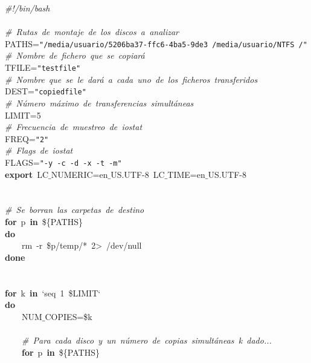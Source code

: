 \noindent
\mbox{}\textit{\#!/bin/bash} \\
\mbox{} \\
\mbox{}\textit{\#\ Rutas\ de\ montaje\ de\ los\ discos\ a\ analizar} \\
\mbox{}PATHS=\texttt{"{}/media/usuario/5206ba37-ffc6-4ba5-9de3\ /media/usuario/NTFS\ /"{}} \\
\mbox{}\textit{\#\ Nombre\ de\ fichero\ que\ se\ copiará} \\
\mbox{}TFILE=\texttt{"{}testfile"{}} \\
\mbox{}\textit{\#\ Nombre\ que\ se\ le\ dará\ a\ cada\ uno\ de\ los\ ficheros\ transferidos} \\
\mbox{}DEST=\texttt{"{}copiedfile"{}} \\
\mbox{}\textit{\#\ Número\ máximo\ de\ transferencias\ simultáneas} \\
\mbox{}LIMIT=5 \\
\mbox{}\textit{\#\ Frecuencia\ de\ muestreo\ de\ iostat} \\
\mbox{}FREQ=\texttt{"{}2"{}} \\
\mbox{}\textit{\#\ Flags\ de\ iostat} \\
\mbox{}FLAGS=\texttt{"{}-y\ -c\ -d\ -x\ -t\ -m"{}}\  \\
\mbox{}\textbf{export}\ LC$\_$NUMERIC=en$\_$US.UTF-8\ LC$\_$TIME=en$\_$US.UTF-8 \\
\mbox{} \\
\mbox{} \\
\mbox{}\textit{\#\ Se\ borran\ las\ carpetas\ de\ destino} \\
\mbox{}\textbf{for}\ p\ \textbf{in}\ \$\{PATHS\} \\
\mbox{}\textbf{do} \\
\mbox{}\ \ \ \ rm\ -r\ \$p/temp/*\ 2\textgreater{}\ /dev/null \\
\mbox{}\textbf{done} \\
\mbox{} \\
\mbox{} \\
\mbox{}\textbf{for}\ k\ \textbf{in}\ `seq\ 1\ \$LIMIT` \\
\mbox{}\textbf{do} \\
\mbox{}\ \ \ \ NUM$\_$COPIES=\$k \\
\mbox{} \\
\mbox{}\ \ \ \ \textit{\#\ Para\ cada\ disco\ y\ un\ número\ de\ copias\ simultáneas\ k\ dado...} \\
\mbox{}\ \ \ \ \textbf{for}\ p\ \textbf{in}\ \$\{PATHS\} \\
